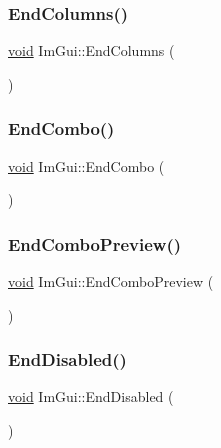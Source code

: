 \mbox{\label{namespaceImGui_af93bed3bce5475fe4d525d744f16aa20}} 
\subsubsection{\texorpdfstring{End\+Columns()}{EndColumns()}}
{\footnotesize\ttfamily \hyperlink{imgui__impl__opengl3__loader_8h_ac668e7cffd9e2e9cfee428b9b2f34fa7}{void} Im\+Gui\+::\+End\+Columns (\begin{DoxyParamCaption}{ }\end{DoxyParamCaption})}

\mbox{\label{namespaceImGui_a63434692d7de278875c7ea0143fbe6e4}} 
\subsubsection{\texorpdfstring{End\+Combo()}{EndCombo()}}
{\footnotesize\ttfamily \hyperlink{imgui__impl__opengl3__loader_8h_ac668e7cffd9e2e9cfee428b9b2f34fa7}{void} Im\+Gui\+::\+End\+Combo (\begin{DoxyParamCaption}{ }\end{DoxyParamCaption})}

\mbox{\label{namespaceImGui_aff0228bbaf4d5a217944e00eb56f3714}} 
\subsubsection{\texorpdfstring{End\+Combo\+Preview()}{EndComboPreview()}}
{\footnotesize\ttfamily \hyperlink{imgui__impl__opengl3__loader_8h_ac668e7cffd9e2e9cfee428b9b2f34fa7}{void} Im\+Gui\+::\+End\+Combo\+Preview (\begin{DoxyParamCaption}{ }\end{DoxyParamCaption})}

\mbox{\label{namespaceImGui_a9e6088c6c690ddff1302b6e42b380733}} 
\subsubsection{\texorpdfstring{End\+Disabled()}{EndDisabled()}}
{\footnotesize\ttfamily \hyperlink{imgui__impl__opengl3__loader_8h_ac668e7cffd9e2e9cfee428b9b2f34fa7}{void} Im\+Gui\+::\+End\+Disabled (\begin{DoxyParamCaption}{ }\end{DoxyParamCaption})}

